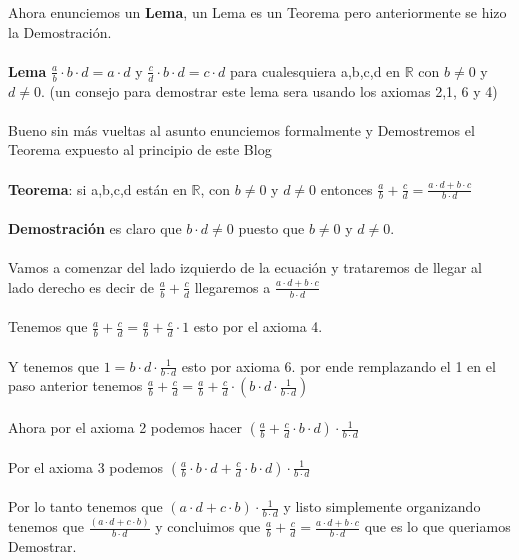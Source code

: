 \documentclass{article}
\begin{document}
Ahora enunciemos un \textbf{Lema}, un Lema es un Teorema pero anteriormente se hizo la Demostración.
\\ \\ 
\textbf{Lema} $\frac{a}{b}\cdot b \cdot d = a \cdot d $  y $\frac{c}{d} \cdot b \cdot d = c \cdot d$ para cualesquiera a,b,c,d en $\mathbb R$
con $b \not = 0$ y $d \not = 0$. (un consejo para demostrar este lema sera usando los axiomas 2,1, 6 y 4) 
\\ \\ 
Bueno sin más vueltas al asunto enunciemos formalmente y Demostremos el Teorema expuesto al principio de este Blog \\ \\ 
\textbf{Teorema}: si a,b,c,d están en $\mathbb R$, con $b \not = 0$ y $d \not = 0$ entonces $\frac{a}{b}+\frac{c}{d}=\frac{a \cdot d + b \cdot c}{b \cdot d}$
\\ \\
\textbf{Demostración} es claro que $b \cdot d \not = 0$ puesto que $b \not = 0$ y $d \not = 0$.
\\ \\ 
Vamos a comenzar del lado izquierdo de la ecuación y trataremos de llegar al lado derecho es decir de $\frac{a}{b}+\frac{c}{d}$
llegaremos a $\frac{a \cdot d + b \cdot c}{b \cdot d}$
\\ \\
Tenemos que $\frac{a}{b}+\frac{c}{d}= \frac{a}{b}+\frac{c}{d} \cdot 1$ esto por el axioma 4.
\\ \\
Y tenemos que $1 = b \cdot d \cdot \frac{1}{b \cdot d}$ esto por axioma 6. por ende remplazando el 1 en el paso anterior tenemos
$\frac{a}{b}+\frac{c}{d}= \frac{a}{b}+\frac{c}{d} \cdot (b \cdot d \cdot \frac{1}{b \cdot d}) $ 
\\ \\ 
Ahora por el axioma 2 podemos hacer $(\frac{a}{b}+\frac{c}{d} \cdot b \cdot d )\cdot \frac{1}{b \cdot d}$
\\ \\ 
Por el axioma 3 podemos $(\frac{a}{b}\cdot b \cdot d + \frac{c}{d} \cdot b \cdot d) \cdot \frac{1}{b \cdot d}$
\\ \\ Por lo tanto tenemos que $(a \cdot d + c \cdot b) \cdot \frac{1}{b \cdot d}$ y listo simplemente organizando tenemos que $\frac{(a \cdot d + c \cdot b)}{b \cdot d} $
y concluimos que $\frac{a}{b}+\frac{c}{d}=\frac{a \cdot d + b \cdot c}{b \cdot d}$ que es lo que queriamos Demostrar.
\\ \\ 
\end{document}
